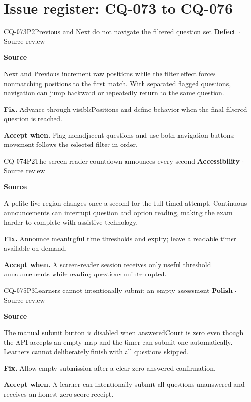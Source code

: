 \section*{Issue register: CQ-073 to CQ-076}
\begin{finding}{CQ-073}{P2}{Previous and Next do not navigate the filtered question set}
\textbf{Defect} $\cdot$ Source review\par
\textbf{Source}\quad{}\par
Next and Previous increment raw positions while the filter effect forces nonmatching positions to the first match. With separated flagged questions, navigation can jump backward or repeatedly return to the same question.\par
\textbf{Fix.} Advance through visiblePositions and define behavior when the final filtered question is reached.\par
\textbf{Accept when.} Flag nonadjacent questions and use both navigation buttons; movement follows the selected filter in order.
\end{finding}
\begin{finding}{CQ-074}{P2}{The screen reader countdown announces every second}
\textbf{Accessibility} $\cdot$ Source review\par
\textbf{Source}\quad{}\par
A polite live region changes once a second for the full timed attempt. Continuous announcements can interrupt question and option reading, making the exam harder to complete with assistive technology.\par
\textbf{Fix.} Announce meaningful time thresholds and expiry; leave a readable timer available on demand.\par
\textbf{Accept when.} A screen-reader session receives only useful threshold announcements while reading questions uninterrupted.
\end{finding}
\begin{finding}{CQ-075}{P3}{Learners cannot intentionally submit an empty assessment}
\textbf{Polish} $\cdot$ Source review\par
\textbf{Source}\quad{}\par
The manual submit button is disabled when answeredCount is zero even though the API accepts an empty map and the timer can submit one automatically. Learners cannot deliberately finish with all questions skipped.\par
\textbf{Fix.} Allow empty submission after a clear zero-answered confirmation.\par
\textbf{Accept when.} A learner can intentionally submit all questions unanswered and receives an honest zero-score receipt.
\end{finding}
